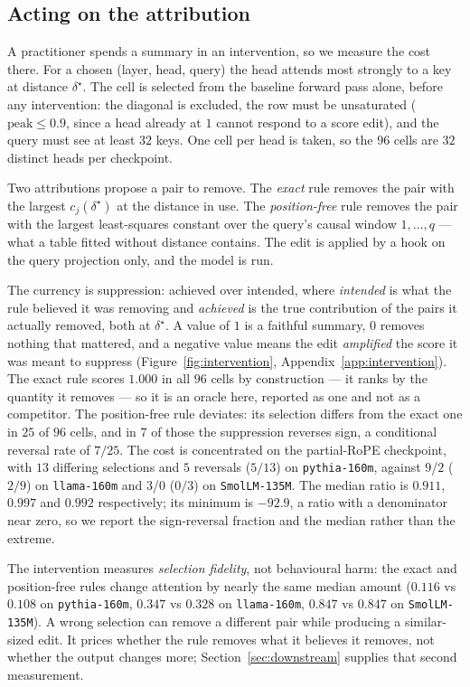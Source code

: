 \documentclass{article}
\theoremstyle{plain}
\theoremstyle{remark}
\begin{document}
\subsection{Acting on the attribution}
\label{sec:intervention}

A practitioner spends a summary in an intervention, so we measure the cost
there. For a chosen (layer, head, query) the head attends most strongly to a key
at distance $\delta^{\star}$. The cell is selected from the baseline forward pass
alone, before any intervention: the diagonal is excluded, the row must be
unsaturated ($\text{peak}\le0.9$, since a head already at $1$ cannot respond to
a score edit), and the query must see at least $32$ keys. One cell per head is
taken, so the $96$ cells are $32$ distinct heads per checkpoint.

Two attributions propose a pair to remove. The \emph{exact} rule removes the
pair with the largest $c_j(\delta^{\star})$ at the distance in use. The
\emph{position-free} rule removes the pair with the largest least-squares
constant over the query's causal window $1,\dots,q$ --- what a table fitted
without distance contains. The edit is applied by a hook on the query projection
only, and the model is run.

The currency is suppression: achieved over intended, where \emph{intended} is
what the rule believed it was removing and \emph{achieved} is the true
contribution of the pairs it actually removed, both at $\delta^{\star}$. A value
of $1$ is a faithful summary, $0$ removes nothing that mattered, and a negative
value means the edit \emph{amplified} the score it was meant to suppress
(Figure~\ref{fig:intervention}, Appendix~\ref{app:intervention}). The
exact rule scores $1.000$ in all $96$ cells by construction --- it ranks by the
quantity it removes --- so it is an oracle here, reported as one and not as a
competitor. The position-free rule deviates: its selection differs from the
exact one in $25$ of $96$ cells, and in $7$ of those the suppression reverses
sign, a conditional reversal rate of $7/25$. The cost is concentrated on the
partial-RoPE checkpoint, with $13$ differing selections and $5$ reversals
($5/13$) on \texttt{pythia-160m}, against $9$/$2$ ($2/9$) on
\texttt{llama-160m} and $3$/$0$ ($0/3$) on \texttt{SmolLM-135M}. The median
ratio is $0.911$, $0.997$ and $0.992$ respectively; its minimum is $-92.9$, a
ratio with a denominator near zero, so we report the sign-reversal fraction and
the median rather than the extreme.

The intervention measures \emph{selection fidelity}, not behavioural harm: the
exact and position-free rules change attention by nearly the same median amount
($0.116$ vs $0.108$ on \texttt{pythia-160m}, $0.347$ vs $0.328$ on
\texttt{llama-160m}, $0.847$ vs $0.847$ on \texttt{SmolLM-135M}). A wrong
selection can remove a different pair while producing a similar-sized edit. It
prices whether the rule removes what it believes it removes, not whether the
output changes more; Section~\ref{sec:downstream} supplies that second
measurement.
\end{document}
